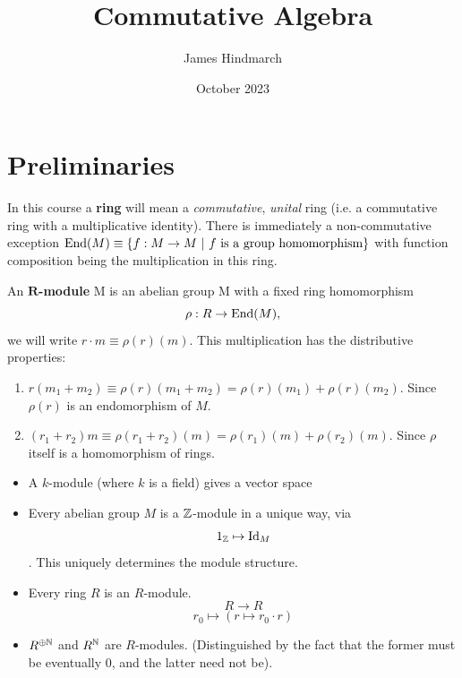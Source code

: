 \documentclass{article}
\title{Commutative Algebra}
\author{James Hindmarch}
\date{October 2023}
\begin{document}
\maketitle
\tableofcontents
\newpage
\newlec
\section{Preliminaries}
\begin{fancydefine}[Ring]
    In this course a \textbf{ring} will mean a \textit{commutative}, \textit{unital} ring (i.e. a commutative ring with a multiplicative identity). \linebreak
    There is immediately a non-commutative exception $\operatorname{End} (M) \equiv \{ f : M \to M \text{ } | \text{ }{f \text{ is a group homomorphism}} \}$ with function composition being the multiplication in this ring.
\end{fancydefine}

 An $\mathbf{R}$\textbf{-module} M is an abelian group M with a fixed ring homomorphism \[ \rho : R \to \operatorname{End}(M), \] we will write $r \cdot m \equiv \rho(r)(m)$. This multiplication has the distributive properties:
\begin{enumerate}
    \item $r(m_{1} + m_{2}) \equiv \rho(r)(m_{1} + m_{2}) = \rho(r)(m_{1}) + \rho(r)(m_{2})$. Since $\rho(r)$ is an endomorphism of $M$.
    \item $(r_{1} + r_{2})m \equiv \rho(r_{1} + r_{2})(m) = \rho(r_{1})(m) + \rho(r_{2})(m)$. Since $\rho$ itself is a homomorphism of rings.
\end{enumerate}
\examples
\begin{itemize}
    \item A $k$-module (where $k$ is a field) gives a vector space
    \item Every abelian group $M$ is a $\mathbb{Z}$-module in a unique way, via \[1_{\mathbb{Z}} \mapsto \operatorname{Id}_{M}\]. This uniquely determines the module structure.
    \item Every ring $R$ is an $R$-module. \[ R \to R \] \[ r_{0} \mapsto (r \mapsto r_{0}\cdot r)\]
    \item $R^{\oplus \mathbb{N}}$ and $R^{\mathbb{N}}$ are $R$-modules. (Distinguished by the fact that the former must be eventually $0$, and the latter need not be).
\end{itemize}
\end{document}
